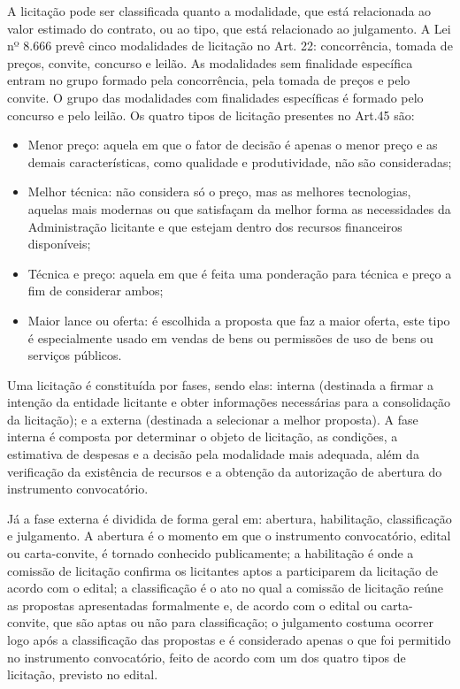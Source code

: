 A licitação pode ser classificada quanto a modalidade, que está relacionada ao valor estimado do contrato, ou ao tipo, que está relacionado ao julgamento. A Lei nº 8.666 prevê cinco modalidades de licitação no Art. 22: concorrência, tomada de preços, convite, concurso e leilão. As modalidades sem finalidade específica entram no grupo formado pela concorrência, pela tomada de preços e pelo convite. O grupo das modalidades com finalidades específicas é formado pelo concurso e pelo leilão. Os quatro tipos de licitação presentes no Art.45 são: 
\begin{itemize}
\item Menor preço: aquela em que o fator de decisão é apenas o menor preço e as demais características, como qualidade e produtividade, não são consideradas;
\item Melhor técnica: não considera só o preço, mas as melhores tecnologias, aquelas mais modernas ou que satisfaçam da melhor forma as necessidades da Administração licitante e que estejam dentro dos recursos financeiros disponíveis;
\item Técnica e preço: aquela em que é feita uma ponderação para técnica e preço a fim de considerar ambos;
\item Maior lance ou oferta: é escolhida a proposta que faz a maior oferta, este tipo é especialmente usado em vendas de bens ou permissões de uso de bens ou serviços públicos.
\end{itemize}

Uma licitação é constituída por fases, sendo elas: interna (destinada a firmar a intenção da entidade licitante e obter informações necessárias para a consolidação da licitação); e a externa (destinada a selecionar a melhor proposta). A fase interna é composta por determinar o objeto de licitação, as condições, a estimativa de despesas e a decisão pela modalidade mais adequada, além da verificação da existência de recursos e a obtenção da autorização de abertura do instrumento convocatório.

Já a fase externa é dividida de forma geral em: abertura, habilitação, classificação e julgamento.  A abertura é o momento em que o instrumento convocatório, edital ou carta-convite, é tornado conhecido publicamente; a habilitação é onde a comissão de licitação confirma os licitantes aptos a participarem da licitação de acordo com o edital; a classificação é o ato no qual a comissão de licitação reúne as propostas apresentadas formalmente e, de acordo com o edital ou carta-convite, que são aptas ou não para classificação; o julgamento costuma ocorrer logo após a classificação das propostas e é considerado apenas o que foi permitido no instrumento convocatório, feito de acordo com um dos quatro tipos de licitação, previsto no edital. 

